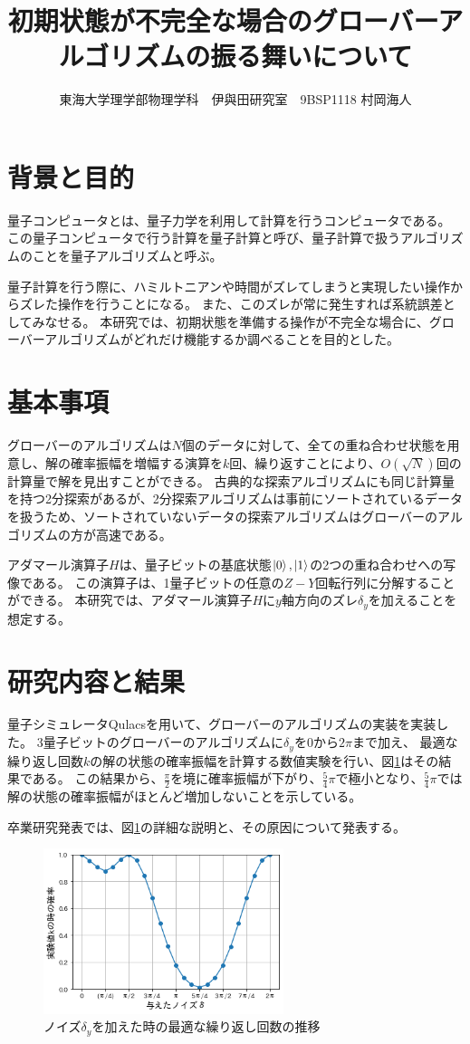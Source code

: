 \documentclass[platex,dvipdfmx, twocolumn]{jsarticle}			%
\title{初期状態が不完全な場合のグローバーアルゴリズムの振る舞いについて}
\author{東海大学理学部物理学科　伊與田研究室　9BSP1118 村岡海人}
\begin{document}
\maketitle
\section{背景と目的}
量子コンピュータとは、量子力学を利用して計算を行うコンピュータである。
この量子コンピュータで行う計算を量子計算と呼び、量子計算で扱うアルゴリズムのことを量子アルゴリズムと呼ぶ。

量子計算を行う際に、ハミルトニアンや時間がズレてしまうと実現したい操作からズレた操作を行うことになる。
また、このズレが常に発生すれば系統誤差としてみなせる。
本研究では、初期状態を準備する操作が不完全な場合に、グローバーアルゴリズムがどれだけ機能するか調べることを目的とした。

\section{基本事項}
グローバーのアルゴリズムは$N個$のデータに対して、全ての重ね合わせ状態を用意し、解の確率振幅を増幅する演算を$k$回、繰り返すことにより、$O(\sqrt{N})$回の計算量で解を見出すことができる。
古典的な探索アルゴリズムにも同じ計算量を持つ2分探索があるが、2分探索アルゴリズムは事前にソートされているデータを扱うため、ソートされていないデータの探索アルゴリズムはグローバーのアルゴリズムの方が高速である。
\cite{QuantumDojo}

アダマール演算子$H$は、量子ビットの基底状態$\ket{0},\ket{1}$の2つの重ね合わせへの写像である。
この演算子は、1量子ビットの任意の$Z-Y$回転行列に分解することができる。
本研究では、アダマール演算子$H$に$y$軸方向のズレ$\delta_y$を加えることを想定する。
\cite{BasicQuantumComputer}

\section{研究内容と結果}
量子シミュレータQulacsを用いて、グローバーのアルゴリズムの実装を実装した。
3量子ビットのグローバーのアルゴリズムに$\delta_y$を$0$から$2\pi$まで加え、
最適な繰り返し回数$k$の解の状態の確率振幅を計算する数値実験を行い、図\ref{fig:P(k)}はその結果である。
この結果から、$\frac{\pi}{2}$を境に確率振幅が下がり、$\frac{5}{4}\pi$で極小となり、$\frac{5}{4}\pi$では解の状態の確率振幅がほとんど増加しないことを示している。

卒業研究発表では、図\ref{fig:P(k)}の詳細な説明と、その原因について発表する。

\begin{figure}
\centering
\includegraphics[width=70mm]{figures/p(k)graph.png}
\caption{ノイズ$\delta_y$を加えた時の最適な繰り返し回数の推移}
\label{fig:P(k)}
\end{figure}



\end{document}
